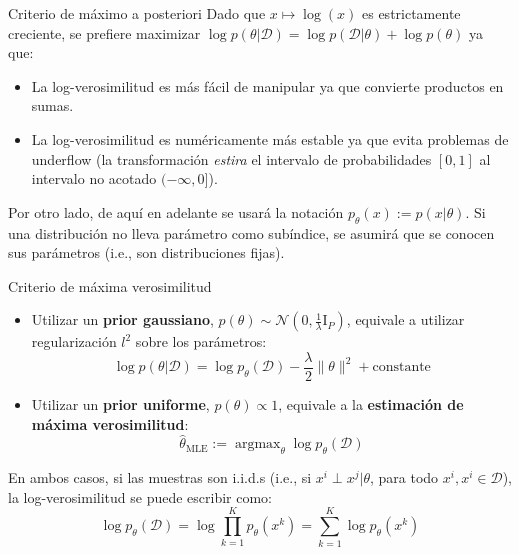 \documentclass{beamer}
\newcommand{\argmax}{\operatorname{argmax}}
\begin{document}
\begin{frame}{Criterio de máximo a posteriori}
    Dado que $x\mapsto \log(x)$ es estrictamente creciente, se prefiere maximizar $\log p(\theta|\mathcal{D})=\log p(\mathcal{D}|\theta)+\log p(\theta)$ ya que:
    \begin{itemize}
        \item La log-verosimilitud es más fácil de manipular ya que convierte productos en sumas.
        \item La log-verosimilitud es numéricamente más estable ya que evita problemas de underflow (la transformación \textit{estira} el intervalo de probabilidades $[0,1]$ al intervalo no acotado $(-\infty,0]$).
    \end{itemize}
    Por otro lado, de aquí en adelante se usará la notación $p_\theta(x):=p(x|\theta)$. Si una distribución no lleva parámetro como subíndice, se asumirá que se conocen sus parámetros (i.e., son distribuciones fijas).
\end{frame}

\begin{frame}{Criterio de máxima verosimilitud}
    \begin{itemize}
        \item Utilizar un \textbf{prior gaussiano}, $p(\theta)\sim\mathcal{N}(0,\frac{1}{\lambda}\text{I}_P)$, equivale a utilizar regularización $l^2$ sobre los parámetros:
    \begin{equation*}
        \log p(\theta|\mathcal{D})=\log p_\theta(\mathcal{D}) - \frac{\lambda}{2}\|\theta\|^2 + \text{constante}
    \end{equation*}
    \item Utilizar un \textbf{prior uniforme}, $p(\theta)\propto 1$, equivale a la \textbf{estimación de máxima verosimilitud}:
    \begin{equation*}
        \hat\theta_\text{MLE}:=\argmax_\theta \log p_\theta(\mathcal{D})
    \end{equation*}
    \end{itemize}
    En ambos casos, si las muestras son i.i.d.s (i.e., si $x^i\perp x^j|\theta$, para todo $x^i, x^i\in\mathcal{D}$), la log-verosimilitud se puede escribir como:
    \begin{equation*}
        \log p_\theta(\mathcal{D})
=\log \prod_{k=1}^K p_\theta(x^k)
=\sum_{k=1}^K \log p_\theta(x^k)
    \end{equation*}
\end{frame}
\end{document}
